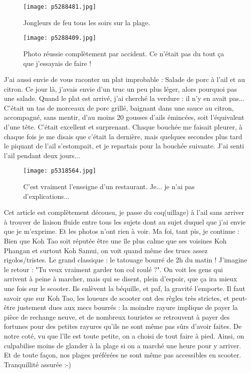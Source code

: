 \documentclass{book}
\begin{document}
\begin{figure}[h]
\centering
\texttt{[image: p5288481.jpg]}
\caption*{Jongleurs de feu tous les soirs sur la plage.}
\end{figure}


\begin{figure}[h]
\centering
\texttt{[image: p5288409.jpg]}
\caption*{Photo réussie complètement par accident. Ce n'était pas du tout ça que j'essayais de faire !}
\end{figure}

J'ai aussi envie de vous raconter un plat improbable : Salade de porc à l'ail et au citron. Ce jour là, j'avais envie d'un truc un peu plus léger, alors pourquoi pas une salade. Quand le plat est arrivé, j'ai cherché la verdure : il n'y en avait pas... C'était un tas de morceaux de porc grillé, baignant dans une sauce au citron, accompagné, sans mentir, d'au moins 20 gousses d'ails émincées, soit l'équivalent d'une tête. C'était excellent et surprenant. Chaque bouchée me faisait pleurer, à chaque fois je me disais que c'était la dernière, mais quelques secondes plus tard le piquant de l'ail s'estompait, et je repartais pour la bouchée suivante. J'ai senti l'ail pendant deux jours...


\begin{figure}[h]
\centering
\texttt{[image: p5318564.jpg]}
\caption*{C'est vraiment l'enseigne d'un restaurant. Je... je n'ai pas d'explications...}
\end{figure}

Cet article est complètement décousu, je passe du coq(uillage) à l'ail sans arriver à trouver de liaison fluide entre tous les sujets dont au sujet duquel que j'ai envie que je m'exprime. Et les photos n'ont rien à voir. Ma foi, tant pis, je continue : Bien que Koh Tao soit réputée être une île plus calme que ses voisines Koh Phangan et surtout Koh Samui, on voit quand même des trucs assez rigolos/tristes. Le grand classique : le tatouage bourré de 2h du matin ! J'imagine le retour : "Tu veux vraiment garder ton col roulé ?". On voit les gens qui arrivent à peine à marcher, mais qui se disent, plein d'espoir, que ça ira mieux une fois sur le scooter. Ils enlèvent la béquille, et paf, la gravité l'emporte. Il faut savoir que sur Koh Tao, les loueurs de scooter ont des règles très strictes, et peut-être justement dues aux mecs bourrés : la moindre rayure implique de payer la pièce de rechange neuve, et de nombreux touristes se retrouvent à payer des fortunes pour des petites rayures qu'ils ne sont même pas sûrs d'avoir faites. De notre coté, vu que l'île est toute petite, on a choisi de tout faire à pied. Ainsi, on culpabilise moins de glander à la plage si on a marché une heure pour y arriver. Et de toute façon, nos plages préférées ne sont même pas accessibles en scooter. Tranquillité assurée :-)
\end{document}
